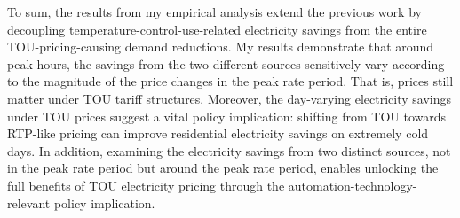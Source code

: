 To sum, the results from my empirical analysis extend the previous work by decoupling temperature-control-use-related electricity savings from the entire TOU-pricing-causing demand reductions. My results demonstrate that around peak hours, the savings from the two different sources sensitively vary according to the magnitude of the price changes in the peak rate period. That is, prices still matter under TOU tariff structures. Moreover, the day-varying electricity savings under TOU prices suggest a vital policy implication: shifting from TOU towards RTP-like pricing can improve residential electricity savings on extremely cold days. In addition, examining the electricity savings from two distinct sources, not in the peak rate period but around the peak rate period, enables unlocking the full benefits of TOU electricity pricing through the automation-technology-relevant policy implication. 
